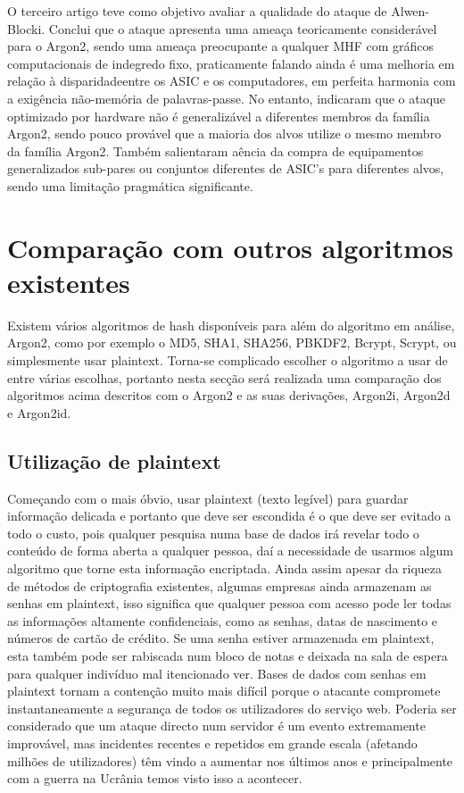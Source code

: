 \documentclass[conference]{IEEEtran}
\begin{document}
O terceiro artigo \cite{chen2017investigation} teve como objetivo avaliar a qualidade do 
ataque de Alwen-Blocki. Conclui que o ataque apresenta uma ameaça teoricamente considerável 
para o Argon2, sendo uma ameaça preocupante a qualquer MHF com gráficos computacionais 
de indegredo fixo, praticamente falando ainda é uma melhoria em relação à disparidadeentre 
os ASIC e os computadores, em perfeita harmonia com a exigência não-memória de palavras-passe. 
No entanto, indicaram que o ataque optimizado por hardware não é generalizável a diferentes 
membros da família Argon2, sendo pouco provável que a maioria dos alvos utilize o mesmo 
membro da família Argon2. Também salientaram aência da compra de equipamentos generalizados 
sub-pares ou conjuntos diferentes de ASIC's para diferentes alvos, sendo uma limitação 
pragmática significante.

\section{Comparação com outros algoritmos existentes}

Existem vários algoritmos de hash disponíveis para além do algoritmo em análise, Argon2, como por 
exemplo o MD5, SHA1, SHA256, PBKDF2, Bcrypt, Scrypt, ou simplesmente usar plaintext. Torna-se 
complicado escolher o algoritmo a usar de entre várias escolhas, portanto 
nesta secção será realizada uma comparação dos algoritmos acima descritos 
com o Argon2 e as suas derivações, Argon2i, Argon2d e Argon2id. 

\subsection{Utilização de plaintext}

Começando com o mais óbvio, usar plaintext (texto legível) para guardar informação delicada e 
portanto que deve ser escondida é o que deve ser evitado a todo o custo, pois 
qualquer pesquisa numa base de dados irá revelar todo o conteúdo de forma aberta 
a qualquer pessoa, daí a necessidade de usarmos algum algoritmo que torne esta 
informação encriptada. Ainda assim apesar da riqueza de métodos de criptografia 
existentes, algumas empresas ainda armazenam as senhas em plaintext, isso significa 
que qualquer pessoa com acesso pode ler todas as informações altamente confidenciais, 
como as senhas, datas de nascimento e números de cartão de crédito. 
Se uma senha estiver armazenada em plaintext, esta também pode ser rabiscada num bloco de notas e 
deixada na sala de espera para qualquer indivíduo mal itencionado ver. Bases de dados com 
senhas em plaintext tornam a contenção muito mais difícil porque o atacante compromete 
instantaneamente a segurança de todos os utilizadores do serviço web. Poderia ser 
considerado que um ataque directo num servidor é um evento extremamente improvável, 
mas incidentes recentes e repetidos em grande escala (afetando milhões de utilizadores) 
têm vindo a aumentar nos últimos anos \cite{ashley2022cyber} e principalmente com a 
guerra na Ucrânia temos visto isso a acontecer.
\end{document}
